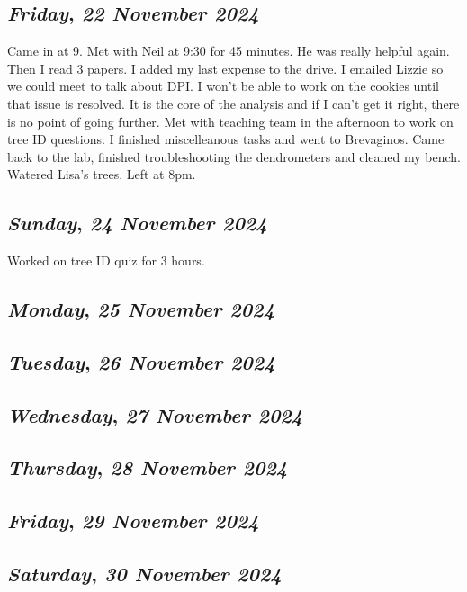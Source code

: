 \def\day{\textit{22 November 2024}}
\def\weekday{\textit{Friday}}
\subsection*{\weekday, \day}
Came in at 9. Met with Neil at 9:30 for 45 minutes. He was really helpful again. Then I read 3 papers. I added my last expense to the drive. I emailed Lizzie so we could meet to talk about DPI. I won't be able to work on the cookies until that issue is resolved. It is the core of the analysis and if I can't get it right, there is no point of going further. Met with teaching team in the afternoon to work on tree ID questions. I finished miscelleanous tasks and went to Brevaginos. Came back to the lab, finished troubleshooting the dendrometers and cleaned my bench. Watered Lisa's trees. Left at 8pm. 

\def\day{\textit{24 November 2024}}
\def\weekday{\textit{Sunday}}
\subsection*{\weekday, \day}
Worked on tree ID quiz for 3 hours. 
\def\day{\textit{25 November 2024}}
\def\weekday{\textit{Monday}}
\subsection*{\weekday, \day}

\def\day{\textit{26 November 2024}}
\def\weekday{\textit{Tuesday}}
\subsection*{\weekday, \day}

\def\day{\textit{27 November 2024}}
\def\weekday{\textit{Wednesday}}
\subsection*{\weekday, \day}

\def\day{\textit{28 November 2024}}
\def\weekday{\textit{Thursday}}
\subsection*{\weekday, \day}

\def\day{\textit{29 November 2024}}
\def\weekday{\textit{Friday}}
\subsection*{\weekday, \day}

\def\day{\textit{30 November 2024}}
\def\weekday{\textit{Saturday}}
\subsection*{\weekday, \day}
